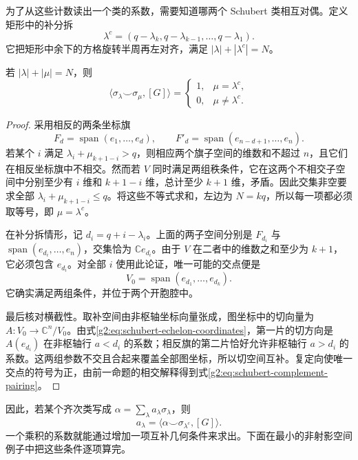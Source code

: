 为了从这些计数读出一个类的系数，需要知道哪两个 Schubert 类相互对偶。定义矩形中的补分拆
\[
	\lambda^c=(q-\lambda_k,q-\lambda_{k-1},\ldots,q-\lambda_1).
\]
它把矩形中余下的方格旋转半周再左对齐，满足 \(|\lambda|+|\lambda^c|=N\)。

\begin{proposition}\label{g2:prop:schubert-complement-pairing}
	若 \(|\lambda|+|\mu|=N\)，则
	\begin{equation}\label{g2:eq:schubert-complement-pairing}
		\langle\sigma_\lambda\smile\sigma_\mu,[G]\rangle
		=\begin{cases}1,&\mu=\lambda^c,\\0,&\mu\ne\lambda^c.\end{cases}
	\end{equation}
\end{proposition}
\begin{proof}
	采用相反的两条坐标旗
	\[
		F_d=\operatorname{span}(e_1,\ldots,e_d),\qquad
		F'_d=\operatorname{span}(e_{n-d+1},\ldots,e_n).
	\]
	若某个 \(i\) 满足 \(\lambda_i+\mu_{k+1-i}>q\)，则相应两个旗子空间的维数和不超过 \(n\)，且它们在相反坐标旗中不相交。然而若 \(V\) 同时满足两组秩条件，它在这两个不相交子空间中分别至少有 \(i\) 维和 \(k+1-i\) 维，总计至少 \(k+1\) 维，矛盾。因此交集非空要求全部 \(\lambda_i+\mu_{k+1-i}\le q\)。将这些不等式求和，左边为 \(N=kq\)，所以每一项都必须取等号，即 \(\mu=\lambda^c\)。

	在补分拆情形，记 \(d_i=q+i-\lambda_i\)。上面的两子空间分别是 \(F_{d_i}\) 与 \(\operatorname{span}(e_{d_i},\ldots,e_n)\)，交集恰为 \(\mathbb Ce_{d_i}\)。由于 \(V\) 在二者中的维数之和至少为 \(k+1\)，它必须包含 \(e_{d_i}\)。对全部 \(i\) 使用此论证，唯一可能的交点便是
	\[
		V_0=\operatorname{span}(e_{d_1},\ldots,e_{d_k}).
	\]
	它确实满足两组条件，并位于两个开胞腔中。

	最后核对横截性。取补空间由非枢轴坐标向量张成，图坐标中的切向量为 \(A:V_0\to\mathbb C^n/V_0\)。由式\eqref{g2:eq:schubert-echelon-coordinates}，第一片的切方向是 \(A(e_{d_i})\) 在非枢轴行 \(a<d_i\) 的系数；相反旗的第二片恰好允许非枢轴行 \(a>d_i\) 的系数。这两组参数不交且合起来覆盖全部图坐标，所以切空间互补。复定向使唯一交点的符号为正，由前一命题的相交解释得到式\eqref{g2:eq:schubert-complement-pairing}。
\end{proof}

因此，若某个齐次类写成 \(\alpha=\sum_\lambda a_\lambda\sigma_\lambda\)，则
\[
	a_\lambda=\langle\alpha\smile\sigma_{\lambda^c},[G]\rangle.
\]
一个乘积的系数就能通过增加一项互补几何条件来求出。下面在最小的非射影空间例子中把这些条件逐项算完。

